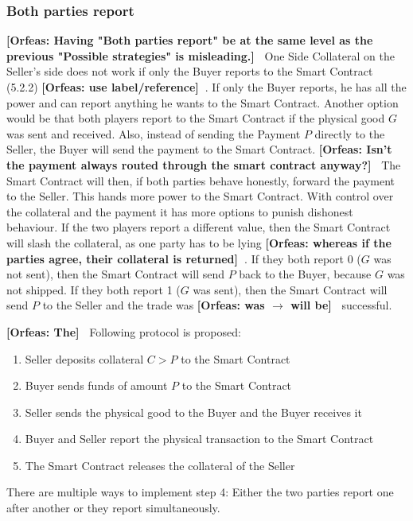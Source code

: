 \documentclass{cacthesis}
\newcommand{\authnote}[3]{{ \footnotesize \textbf{#1[#2: #3]~}}}
\newcommand{\orfnote}[1]{\authnote{\color{blue}}{Orfeas}{#1}}
\begin{document}
\subsubsection{Both parties report}
\orfnote{Having "Both parties report" be at the same level as the previous
"Possible strategies" is misleading.}
One Side Collateral on the Seller's side does not work if only the Buyer reports
to the Smart Contract (5.2.2) \orfnote{use label/reference}. If only the Buyer reports, he has all the power and can report anything he wants to the Smart Contract.\newline
Another option would be that both players report to the Smart Contract if the physical good $G$ was sent and received.\newline
Also, instead of sending the Payment $P$ directly to the Seller, the Buyer will
send the payment to the Smart Contract. \orfnote{Isn't the payment always routed
through the smart contract anyway?} The Smart Contract will then, if both parties behave honestly, forward the payment to the Seller. This hands more power to the Smart Contract. With control over the collateral and the payment it has more options to punish dishonest behaviour.\newline 
If the two players report a different value, then the Smart Contract will slash
the collateral, as one party has to be lying \orfnote{whereas if the parties
agree, their collateral is returned}. If they both report 0 ($G$ was not sent),
then the Smart Contract will send $P$ back to the Buyer, because $G$ was not
shipped. If they both report 1 ($G$ was sent), then the Smart Contract will send
$P$ to the Seller and the trade was \orfnote{was $\rightarrow$ will be} successful.\newline

\orfnote{The} Following protocol is proposed:
\begin{enumerate}
    \item Seller deposits collateral $C > P$ to the Smart Contract
    \item Buyer sends funds of amount $P$ to the Smart Contract 
    \item Seller sends the physical good to the Buyer and the Buyer receives it
    \item Buyer and Seller report the physical transaction to the Smart Contract
    \item The Smart Contract releases the collateral of the Seller
\end{enumerate}
There are multiple ways to implement step 4: Either the two parties report one after another or they report simultaneously.
\end{document}
